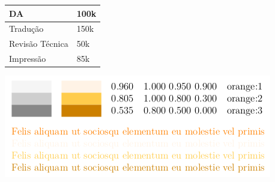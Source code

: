 \begin{table}[]
\begin{tabular}{|l|l|}
\hline
DA              & 100k \\ \hline
Tradução        & 150k \\ \hline
Revisão Técnica & 50k  \\ \hline
Impressão       & 85k  \\ \hline
\end{tabular}
\end{table}


\includegraphics[width=\textwidth]{Teste.png}
